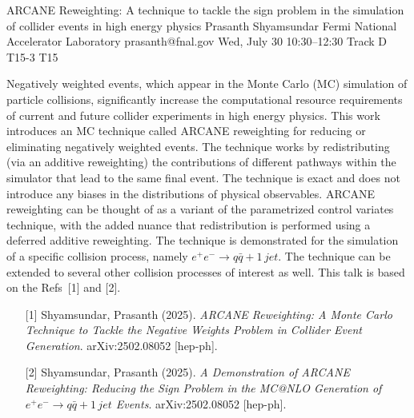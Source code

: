 \begin{talk}
  {ARCANE Reweighting: A technique to tackle the sign problem in the simulation of collider events in high energy physics}%
  {Prasanth Shyamsundar}%
  {Fermi National Accelerator Laboratory}%
  {prasanth@fnal.gov}%
  {}%
  {}%
  {Wed, July 30 10:30–12:30 Track D}%
  {T15-3}%
  {T15}%
			

Negatively weighted events, which appear in the Monte Carlo (MC) simulation of particle collisions, significantly increase the computational resource requirements of current and future collider experiments in high energy physics. This work introduces an MC technique called ARCANE reweighting for reducing or eliminating negatively weighted events. The technique works by redistributing (via an additive reweighting) the contributions of different pathways within the simulator that lead to the same final event. The technique is exact and does not introduce any biases in the distributions of physical observables. ARCANE reweighting can be thought of as a variant of the parametrized control variates technique, with the added nuance that redistribution is performed using a deferred additive reweighting. The technique is demonstrated for the simulation of a specific collision process, namely $e^+ e^- \longrightarrow q \bar{q} + 1\,jet$. The technique can be extended to several other collision processes of interest as well. This talk is based on the Refs~[1] and [2].

\medskip

\begin{enumerate}
    \item[{[1]}] Shyamsundar, Prasanth (2025). {\it ARCANE Reweighting: A Monte Carlo Technique to Tackle the Negative Weights Problem in Collider Event Generation}. arXiv:2502.08052 [hep-ph].
    \item[{[2]}] Shyamsundar, Prasanth (2025). {\it A Demonstration of ARCANE Reweighting: Reducing the Sign Problem in the MC@NLO Generation of $e^+ e^- \longrightarrow q\bar{q} + 1\,jet$ Events}. arXiv:2502.08052 [hep-ph].
\end{enumerate}


\end{talk}
